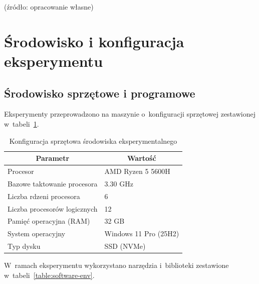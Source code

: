 \vspace{-20pt}
\begin{center}
    \small{(źródło: opracowanie własne)}
\end{center}

\section{Środowisko i konfiguracja eksperymentu}

\subsection{Środowisko sprzętowe i programowe}

Eksperymenty przeprowadzono na maszynie o~konfiguracji sprzętowej zestawionej w~tabeli~\ref{table:hardware-env}.

\setlength{\tabcolsep}{0.5em}
\renewcommand{\arraystretch}{1.2}
\begin{table}[h!]
    \centering
    \begin{tabular}{|l|l|}
        \hline
        \multicolumn{1}{|c|}{\textbf{Parametr}} & \multicolumn{1}{c|}{\textbf{Wartość}} \\
        \hline
        Procesor & AMD Ryzen 5 5600H \\
        \hline
        Bazowe taktowanie procesora & 3.30 GHz \\
        \hline
        Liczba rdzeni procesora & 6 \\
        \hline
        Liczba procesorów logicznych & 12 \\
        \hline
        Pamięć operacyjna (RAM) & 32 GB \\
        \hline
        System operacyjny & Windows 11 Pro (25H2) \\
        \hline
        Typ dysku & SSD (NVMe) \\
        \hline
    \end{tabular}
    \caption{Konfiguracja sprzętowa środowiska eksperymentalnego}
    \label{table:hardware-env}
\end{table}

W~ramach eksperymentu wykorzystano narzędzia i~biblioteki zestawione w~tabeli~\ref{table:software-env}.

